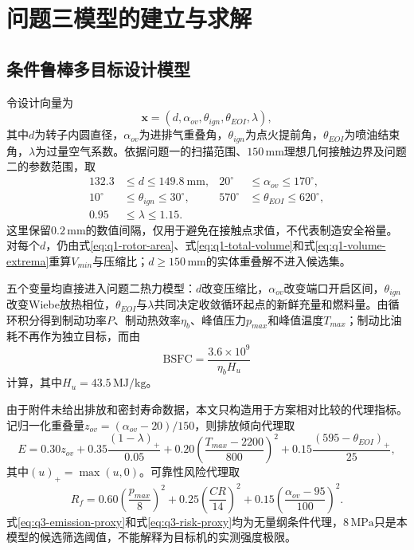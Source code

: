 \documentclass[withoutpreface,bwprint]{cumcmthesis}
\begin{document}
\section{问题三模型的建立与求解}
\subsection{条件鲁棒多目标设计模型}

令设计向量为
\begin{equation}
 \boldsymbol{x}=(d,\alpha_{ov},\theta_{ign},\theta_{EOI},\lambda),
 \label{eq:q3-design-vector}
\end{equation}
其中$d$为转子内圆直径，$\alpha_{ov}$为进排气重叠角，$\theta_{ign}$为点火提前角，$\theta_{EOI}$为喷油结束角，$\lambda$为过量空气系数。依据问题一的扫描范围、$150\,\mathrm{mm}$理想几何接触边界及问题二的参数范围，取
\begin{equation}
 \begin{aligned}
 132.3&\le d\le149.8\ \mathrm{mm},&20^\circ&\le\alpha_{ov}\le170^\circ,\\
 10^\circ&\le\theta_{ign}\le30^\circ,&570^\circ&\le\theta_{EOI}\le620^\circ,\\
 0.95&\le\lambda\le1.15.&&
 \end{aligned}
 \label{eq:q3-bounds}
\end{equation}
这里保留$0.2\,\mathrm{mm}$的数值间隔，仅用于避免在接触点求值，不代表制造安全裕量。对每个$d$，仍由式\eqref{eq:q1-rotor-area}、式\eqref{eq:q1-total-volume}和式\eqref{eq:q1-volume-extrema}重算$V_{min}$与压缩比；$d\ge150\,\mathrm{mm}$的实体重叠解不进入候选集。

五个变量均直接进入问题二热力模型：$d$改变压缩比，$\alpha_{ov}$改变端口开启区间，$\theta_{ign}$改变Wiebe放热相位，$\theta_{EOI}$与$\lambda$共同决定收敛循环起点的新鲜充量和燃料量。由循环积分得到制动功率$P$、制动热效率$\eta_b$、峰值压力$p_{max}$和峰值温度$T_{max}$；制动比油耗不再作为独立目标，而由
\begin{equation}
 \mathrm{BSFC}=\frac{3.6\times10^9}{\eta_b H_u}
 \label{eq:q3-bsfc}
\end{equation}
计算，其中$H_u=43.5\,\mathrm{MJ/kg}$。

由于附件未给出排放和密封寿命数据，本文只构造用于方案相对比较的代理指标。记归一化重叠量$z_{ov}=(\alpha_{ov}-20)/150$，则排放倾向代理取
\begin{equation}
 E=0.30z_{ov}+0.35\frac{(1-\lambda)_+}{0.05}
 +0.20\left(\frac{T_{max}-2200}{800}\right)^2
 +0.15\frac{(595-\theta_{EOI})_+}{25},
 \label{eq:q3-emission-proxy}
\end{equation}
其中$(u)_+=\max(u,0)$。可靠性风险代理取
\begin{equation}
 R_f=0.60\left(\frac{p_{max}}{8}\right)^2
 +0.25\left(\frac{CR}{14}\right)^2
 +0.15\left(\frac{\alpha_{ov}-95}{100}\right)^2.
 \label{eq:q3-risk-proxy}
\end{equation}
式\eqref{eq:q3-emission-proxy}和式\eqref{eq:q3-risk-proxy}均为无量纲条件代理，$8\,\mathrm{MPa}$只是本模型的候选筛选阈值，不能解释为目标机的实测强度极限。
\end{document}

